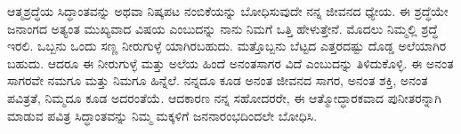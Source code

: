 ಆತ್ಮಶ್ರದ್ಧೆಯ ಸಿದ್ಧಾಂತವನ್ನು ಅಥವಾ ನಿಷ್ಕಪಟ ನಂಬಿಕೆಯನ್ನು ಬೋಧಿಸುವುದೇ ನನ್ನ ಜೀವನದ ಧ್ಯೇಯ. ಈ ಶ್ರದ್ಧೆಯೇ ಜನಾಂಗದ ಅತ್ಯಂತ ಮುಖ್ಯವಾದ ವಿಷಯ ಎಂಬುದನ್ನು ನಾನು ನಿಮಗೆ ಒತ್ತಿ ಹೇಳುತ್ತೇನೆ. ಮೊದಲು ನಿಮ್ಮಲ್ಲಿ ಶ್ರದ್ಧೆ ಇರಲಿ. ಒಬ್ಬನು ಒಂದು ಸಣ್ಣ ನೀರುಗುಳ್ಳೆ ಯಾಗಿರಬಹುದು. ಮತ್ತೊಬ್ಬನು ಬೆಟ್ಟದ ಎತ್ತರದಷ್ಟು ದೊಡ್ಡ ಅಲೆಯಾಗಿರ ಬಹುದು. ಆದರೂ ಈ ನೀರುಗುಳ್ಳೆ ಮತ್ತು ಅಲೆಯ ಹಿಂದೆ ಅನಂತಸಾಗರ ವಿದೆ ಎಂಬುದನ್ನು ತಿಳಿದುಕೊಳ್ಳಿ. ಈ ಅನಂತ ಸಾಗರವೇ ನಮಗೂ ಮತ್ತು ನಿಮಗೂ ಹಿನ್ನೆಲೆ. ನನ್ನದೂ ಕೂಡ ಅನಂತ ಜೀವನದ ಸಾಗರ, ಅನಂತ ಶಕ್ತಿ, ಅನಂತ ಪವಿತ್ರತೆ, ನಿಮ್ಮದೂ ಕೂಡ ಅದರಂತೆಯೆ. ಆದಕಾರಣ ನನ್ನ ಸಹೋದರರೇ, ಈ ಆತ್ಮೋದ್ಧಾರಕವಾದ ಪುನೀತರನ್ನಾಗಿ ಮಾಡುವ ಪವಿತ್ರ ಸಿದ್ಧಾಂತವನ್ನು ನಿಮ್ಮ ಮಕ್ಕಳಿಗೆ ಜನನಾರಂಭದಿಂದಲೇ ಬೋಧಿಸಿ.

